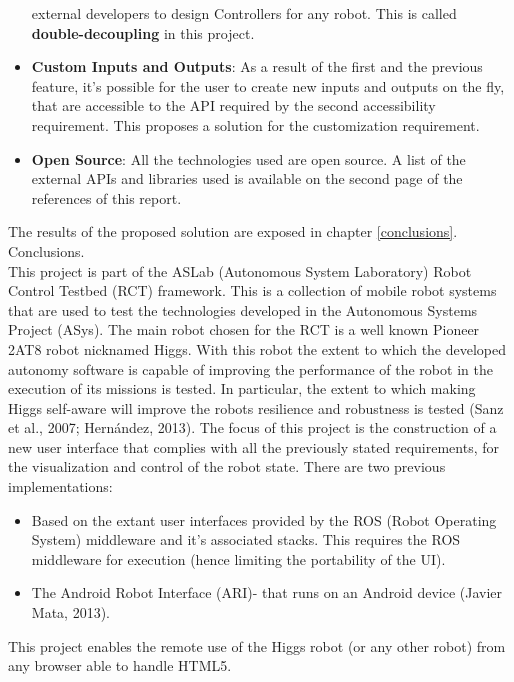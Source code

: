 \begin{itemize}
	external developers to design Controllers for any robot. This is called \textbf{double-decoupling} in this project.	
	\item \textbf{Custom Inputs and Outputs}: As a result of the first and the previous feature, it's possible for the user 
	to create new inputs and outputs on the fly, that are accessible to the API required by the second accessibility 
	requirement. This proposes a solution for the customization requirement.
	\item \textbf{Open Source}: All the technologies used are open source. A list of the external APIs and libraries used is 
	available on the second page of the references of this report.
\end{itemize}
The results of the proposed solution are exposed in chapter \ref{conclusions}. Conclusions.\\

This project is part of the ASLab (Autonomous System Laboratory) Robot Control Testbed (RCT) framework. This is a collection 
of mobile robot systems that are used to test the technologies developed in the Autonomous Systems Project (ASys). The main 
robot chosen for the RCT is a well known Pioneer 2AT8 robot nicknamed Higgs. With this robot the extent to which the 
developed autonomy software is capable of improving the performance of the robot in the execution of its missions is tested. 
In particular, the extent to which making Higgs self-aware will improve the robots resilience and robustness is tested (Sanz 
et al., 2007; Hernández, 2013). The focus of this project is the construction of a new user interface that complies with all 
the previously stated requirements, for the visualization and control of the robot state. There are two previous 
implementations:
\begin{itemize}
	\item Based on the extant user interfaces provided by the ROS (Robot Operating System) middleware and it's associated 
	stacks. This requires the ROS middleware for execution (hence limiting the portability of the UI).
	\item The Android Robot Interface (ARI)- that runs on an Android device (Javier Mata, 2013).
\end{itemize}
This project enables the remote use of the Higgs robot (or any other robot) from any browser able to handle HTML5.